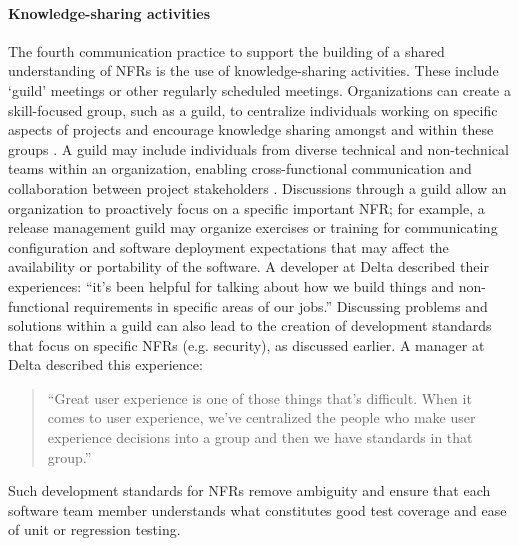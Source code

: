 \documentclass[smallextended]{svjour3}
\begin{document}
\paragraph{Knowledge-sharing activities} The fourth communication practice to support the building of a shared understanding of NFRs is the use of knowledge-sharing activities. These include `guild' meetings or other regularly scheduled meetings.
Organizations can create a skill-focused group, such as a guild, to centralize individuals working on specific aspects of projects and encourage knowledge sharing amongst and within these groups \cite[cf.][]{stol2022gamification}.
A guild may include individuals from diverse technical and non-technical teams within an organization, enabling cross-functional communication and collaboration between project stakeholders \citep{cooper2018}. 
Discussions through a guild allow an organization to proactively focus on a specific important NFR; for example, a release management guild may organize exercises or training for communicating configuration and software deployment expectations that may affect the availability or portability of the software. A developer at Delta described their experiences:
\textmd{``it's been helpful for talking about how we build things and non-functional requirements in specific areas of our jobs.''}
Discussing problems and solutions within a guild can also lead to the creation of development standards that focus on specific NFRs (e.g. security), as discussed earlier. 
A manager at Delta described this experience:
\begin{quote}
    ``Great user experience is one of those things that’s difficult. When it comes to user experience, we've centralized the people who make user experience decisions into a group and then we have standards in that group.''   
\end{quote}
Such development standards for NFRs remove ambiguity and ensure that each software team member understands what constitutes good test coverage and ease of unit or regression testing.  
\end{document}
